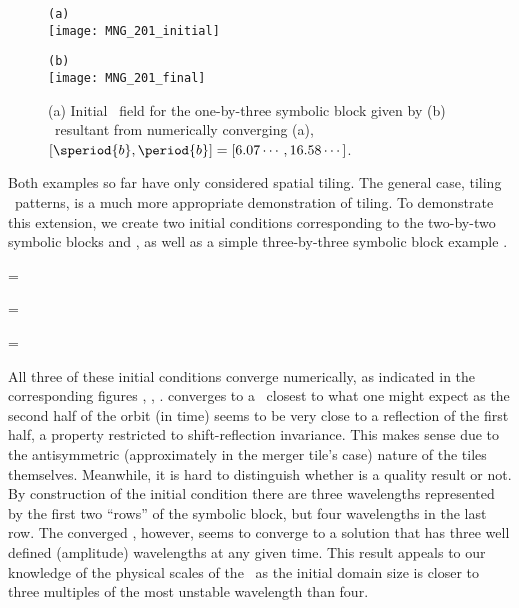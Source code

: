 \begin{figure}
\begin{minipage}[height=.4\textheight]{.5\textwidth}
\centering \small{\texttt{(a)}}\\
\texttt{[image: MNG\_201\_initial]}
\end{minipage}
\begin{minipage}[height=.4\textheight]{.5\textwidth}
\centering \small{\texttt{(b)}}\\
\texttt{[image: MNG\_201\_final]}
\end{minipage}
\caption{ \label{fig:block201}
(a) Initial \spt\ field for the one-by-three symbolic block given by 
(b) \twoT\ resultant from numerically converging (a),
$[\speriod{b},\period{b}]=[6.07\cdots,16.58\cdots]$.
}
\end{figure}

Both examples so far have only considered spatial tiling. The general
case, tiling \spt\ patterns, is a much more appropriate demonstration
of tiling.
To demonstrate this extension,
we create two initial conditions corresponding to
the two-by-two symbolic blocks 
and , as well as a
simple three-by-three symbolic
block example .

\beq
\Mm=\left[\begin{array}{c}
0\,1 \\
1\,0
\end{array}\right]

\beq
\Mm=\left[\begin{array}{c}
0\,2 \\
1\,0
\end{array}\right]


\beq
\Mm=\left[\begin{array}{c}
0\,0\,0 \\
0\,0\,0 \\
0\,0\,2
\end{array}\right]

All three of these initial conditions converge numerically, as indicated
in the corresponding figures ,
, . 
converges to a \twot\ closest to what one might expect as the second half
of the orbit (in time) seems to be very close to a reflection of the first
half, a property restricted to shift-reflection invariance. This makes
sense due to the antisymmetric (approximately in the merger tile's case)
nature of the tiles themselves. Meanwhile, it is hard
to distinguish whether  is a quality result or not.
By construction of the initial condition there are three wavelengths
represented by the first two ``rows'' of the symbolic block, but four
wavelengths in the last row. The converged \twot, however, seems to
converge to a solution that has three well defined (amplitude) wavelengths
at any given time. This result appeals to our knowledge of the physical
scales of the \KSe\ as the initial domain size is closer to three multiples
of the most unstable wavelength than four.

